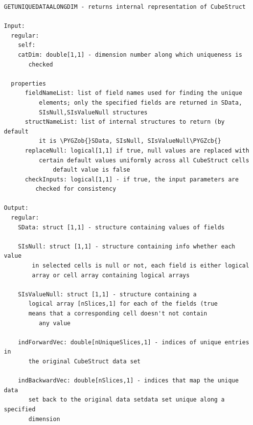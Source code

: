 \documentclass[letterpaper,10pt,english]{sphinxmanual}
\def\PYGZob{\char`\{}
\def\PYGZcb{\char`\}}
\begin{document}
\begin{Verbatim}[commandchars=\\\{\}]
GETUNIQUEDATAALONGDIM - returns internal representation of CubeStruct

Input:
  regular:
    self:
    catDim: double[1,1] - dimension number along which uniqueness is
       checked

  properties
      fieldNameList: list of field names used for finding the unique
          elements; only the specified fields are returned in SData,
          SIsNull,SIsValueNull structures
      structNameList: list of internal structures to return (by default
          it is \PYGZob{}SData, SIsNull, SIsValueNull\PYGZcb{}
      replaceNull: logical[1,1] if true, null values are replaced with
          certain default values uniformly across all CubeStruct cells
              default value is false
      checkInputs: logical[1,1] - if true, the input parameters are
         checked for consistency

Output:
  regular:
    SData: struct [1,1] - structure containing values of fields

    SIsNull: struct [1,1] - structure containing info whether each value
        in selected cells is null or not, each field is either logical
        array or cell array containing logical arrays

    SIsValueNull: struct [1,1] - structure containing a
       logical array [nSlices,1] for each of the fields (true
       means that a corresponding cell doesn't not contain
          any value

    indForwardVec: double[nUniqueSlices,1] - indices of unique entries in
       the original CubeStruct data set

    indBackwardVec: double[nSlices,1] - indices that map the unique data
       set back to the original data setdata set unique along a specified
       dimension
\end{Verbatim}
\end{document}
